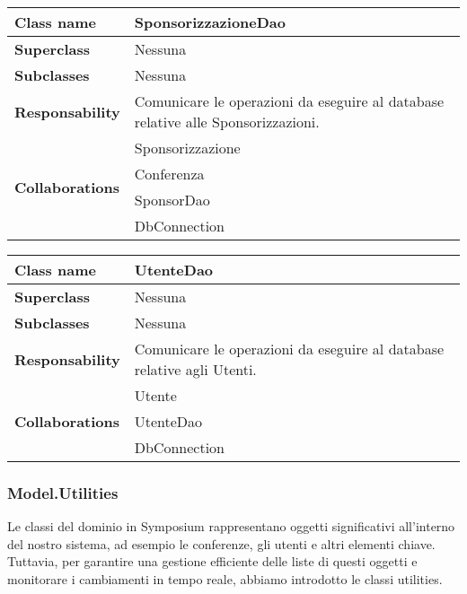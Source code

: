 \begin{table}[h!]
	\begin{tabular}{|l|l|}
		\hline 
		\textbf{Class name} & SponsorizzazioneDao
		\\ \hline
		\textbf{Superclass} & Nessuna
		\\ \hline
		\multirow{1}{*}{\textbf{Subclasses}} & Nessuna
		\\ \hline
		\textbf{Responsability} & Comunicare le operazioni da eseguire al database relative alle Sponsorizzazioni.
		\\ \hline
		\multirow{4}{*}{\textbf{Collaborations}} & Sponsorizzazione \\ 
		& Conferenza \\
		& SponsorDao \\
		& DbConnection \\ \hline
	\end{tabular}
\end{table}

\begin{table}[h!]
	\begin{tabular}{|l|l|}
		\hline 
		\textbf{Class name} & UtenteDao
		\\ \hline
		\textbf{Superclass} & Nessuna
		\\ \hline
		\multirow{1}{*}{\textbf{Subclasses}} & Nessuna
		\\ \hline
		\textbf{Responsability} & Comunicare le operazioni da eseguire al database relative agli Utenti.
		\\ \hline
		\multirow{3}{*}{\textbf{Collaborations}} & Utente \\ 
		& UtenteDao \\
		& DbConnection \\ \hline
	\end{tabular}
\end{table}

\subsubsection{Model.Utilities}
Le classi del dominio in Symposium rappresentano oggetti significativi all'interno del nostro sistema, ad esempio le conferenze, gli utenti e altri elementi chiave. Tuttavia, per garantire una gestione efficiente delle liste di questi oggetti e monitorare i cambiamenti in tempo reale, abbiamo introdotto le classi utilities.
\bigskip

